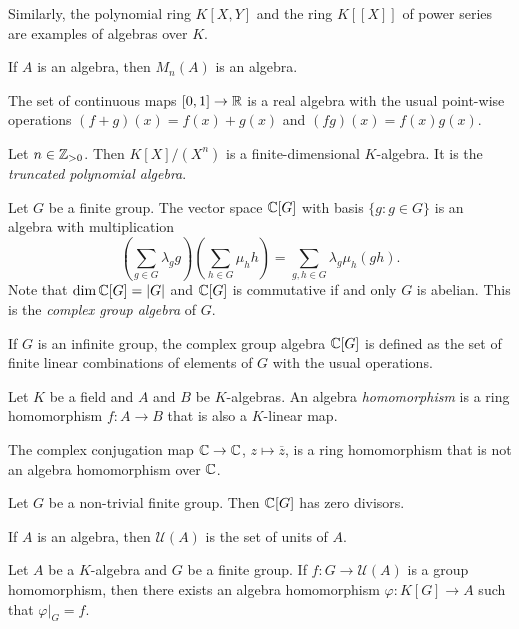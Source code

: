 Similarly, the polynomial ring $K[X,Y]$ and the ring $K[\![X]\!]$ of power series
are examples of algebras over $K$. 

\begin{example}
	If $A$ is an algebra, then  $M_n(A)$ is an algebra. 
\end{example}

\begin{example}
	The set of continuous maps $[0,1]\to\mathbb{R}$ is a real algebra with the usual
	point-wise operations $(f+g)(x)=f(x)+g(x)$ and $(fg)(x)=f(x)g(x)$. 
\end{example}

\begin{example}
	Let $n\in\mathbb{Z}_{>0}$. Then $K[X]/(X^n)$ is a finite-dimensional $K$-algebra. 
    It is the \emph{truncated polynomial algebra}.  
\end{example}

\begin{example}
	Let $G$ be a finite group. The vector space 
	$\mathbb{C}[G]$ with basis $\{g:g\in G\}$
	is an algebra with multiplication
	\[
	\left(\sum_{g\in G}\lambda_gg\right)\left(\sum_{h\in G}\mu_hh\right)
	=\sum_{g,h\in G}\lambda_g\mu_h(gh).
	\] 	
	Note that $\dim\mathbb{C}[G]=|G|$ and
	$\mathbb{C}[G]$ is commutative if and only $G$ is abelian. 
	This is the \emph{complex group algebra} of $G$. 
\end{example}

If $G$ is an infinite group, the complex group algebra $\mathbb{C}[G]$ 
is defined as the set 
of finite linear combinations of elements of $G$ 
with the usual operations. 

\begin{definition}
    Let $K$ be a field and $A$ and $B$ be $K$-algebras. 
    An algebra \emph{homomorphism} is a ring homomorphism $f\colon A\to B$ that is also a $K$-linear map. 
\end{definition}

The complex conjugation map  
$\mathbb{C}\to \mathbb{C}$, $z\mapsto\overline{z}$, is a ring homomorphism that is not an algebra homomorphism over $\mathbb{C}$. 
 
\begin{exercise}
\label{xca:G_zero_divisors}
	Let $G$ be a non-trivial finite group. 
	Then $\mathbb{C}[G]$ has zero divisors. 
\end{exercise}

If $A$ is an algebra, then $\mathcal{U}(A)$ is the set 
of units of $A$. 

\begin{exercise}
\label{xca:units_UP}
	Let $A$ be a $K$-algebra and $G$ be a finite group. 
	If $f\colon G\to\mathcal{U}(A)$ is a group homomorphism, 
	then there exists an algebra homomorphism 
	$\varphi\colon K[G]\to A$ such that $\varphi|_G=f$.   	
\end{exercise}

